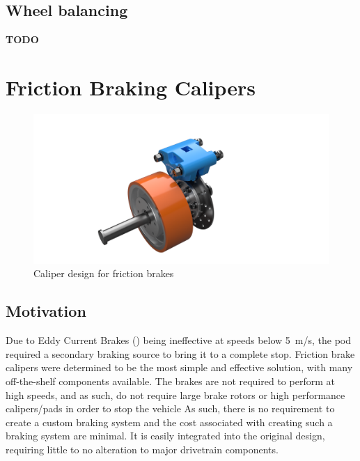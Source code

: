 \documentclass[main.tex]{subfiles}
\begin{document}
    \subsection{Wheel balancing}
    \textbf{TODO}
    \section{Friction Braking Calipers}
    \label{sec:friction-braking-calipers}
    \begin{figure}[H]
        \centering
        \includegraphics[width=\linewidth]{images/fig23}
        \caption{Caliper design for friction brakes}
    \end{figure}

    \subsection{Motivation}
    Due to Eddy Current Brakes () being ineffective at speeds below \SI{5}{m/s}, the pod required a secondary braking source to bring it to a complete stop. Friction brake calipers were determined to be the most simple and effective solution, with many off-the-shelf components available. The brakes are not required to perform at high speeds, and as such, do not require large brake rotors or high performance calipers/pads in order to stop the vehicle  As such, there is no requirement to create a custom braking system and the cost associated with creating such a braking system are minimal. It is easily integrated into the original design, requiring little to no alteration to major drivetrain components.\\
\end{document}
